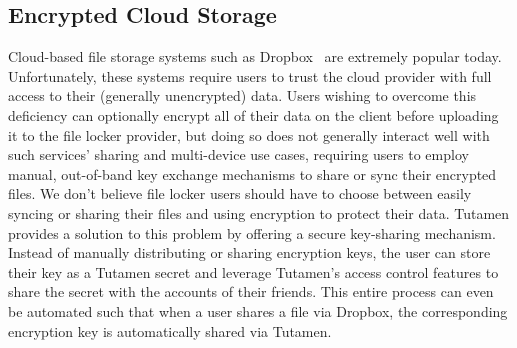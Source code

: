 \subsection{Encrypted Cloud Storage}

Cloud-based file storage systems such as Dropbox~\cite{dropbox} are
extremely popular today. Unfortunately, these systems require users to
trust the cloud provider with full access to their (generally
unencrypted) data. Users wishing to overcome this deficiency can
optionally encrypt all of their data on the client before uploading it
to the file locker provider, but doing so does not generally interact
well with such services' sharing and multi-device use cases, requiring
users to employ manual, out-of-band key exchange mechanisms to share
or sync their encrypted files. We don't believe file locker users
should have to choose between easily syncing or sharing their files
and using encryption to protect their data. Tutamen provides a
solution to this problem by offering a secure key-sharing
mechanism. Instead of manually distributing or sharing encryption
keys, the user can store their key as a Tutamen secret and leverage
Tutamen's access control features to share the secret with the
accounts of their friends. This entire process can even be automated
such that when a user shares a file via Dropbox, the corresponding
encryption key is automatically shared via Tutamen.

